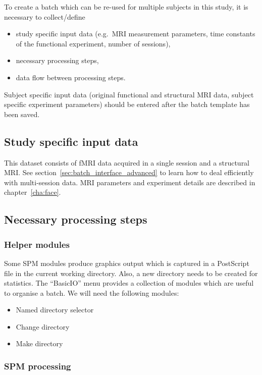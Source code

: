 \documentclass[a4paper]{book}
\begin{document}
To create a batch which can be re-used for multiple subjects in this study, it
is necessary to collect/define
\begin{itemize}
\item study specific input data (e.g.\ MRI measurement parameters, time
  constants of the functional experiment, number of sessions),
\item necessary processing steps,
\item data flow between processing steps.
\end{itemize}
Subject specific input data (original functional and structural MRI data,
subject specific experiment parameters) should be entered after the batch
template has been saved.

\subsection{Study specific input data}

This dataset consists of fMRI data acquired in a single session and a
structural MRI. See section~\ref{sec:batch_interface_advanced} to learn how to
deal efficiently with multi-session data. MRI parameters and experiment
details are described in chapter~\ref{cha:face}.

\subsection{Necessary processing steps}

\subsubsection{Helper modules}

Some SPM modules produce graphics output which is captured in a PostScript
file in the current working directory. Also, a new directory needs to be
created for statistics. The ``BasicIO'' menu provides a collection of modules
which are useful to organise a batch. We will need the following modules:

\begin{itemize}
\item Named directory selector
\item Change directory
\item Make directory
\end{itemize}

\subsubsection{SPM processing}
\end{document}
